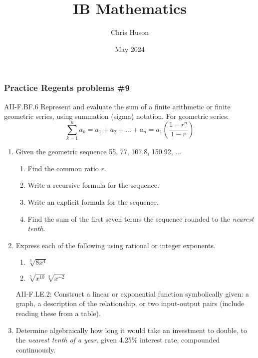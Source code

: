 \documentclass[12pt, twoside]{article}
\title{IB Mathematics}
\author{Chris Huson}
\date{May 2024}
\begin{document}
\subsubsection*{Practice Regents problems \#9}
AII-F.BF.6 Represent and evaluate the sum of a finite arithmetic
or finite geometric series, using summation (sigma) notation. For geometric series:
$$\sum_{k=1}^{n} a_k = a_1 + a_2 + \ldots + a_n = a_1 \left( \frac{1-r^n}{1-r} \right)$$

\begin{enumerate}
\item Given the geometric sequence 55, 77, 107.8, 150.92, $\ldots$
\begin{enumerate}[itemsep=2cm]
    \item Find the common ratio $r$.
    \item Write a recursive formula for the sequence.
    \item Write an explicit formula for the sequence.
    \item Find the sum of the first seven terms the sequence rounded to the \emph{nearest tenth}.
\end{enumerate} \vspace{3cm}

\item Express each of the following using rational or integer exponents. 
\begin{multicols}{2}
    \begin{enumerate}
        \item $\sqrt[3]{8x^4}$
        \item $\sqrt[5]{x^{10}}\sqrt[3]{x^{-2}}$
    \end{enumerate}
\end{multicols}
\vspace{3cm}

\newpage
AII-F.LE.2: Construct a linear or exponential function symbolically given: a graph, a description of the relationship, or two input-output pairs (include reading these from a table).

\item Determine algebraically how long it would take an investment to double, to the \emph{nearest tenth of a year}, given 4.25\% interest rate, compounded continuously.


\end{enumerate}
\end{document}
